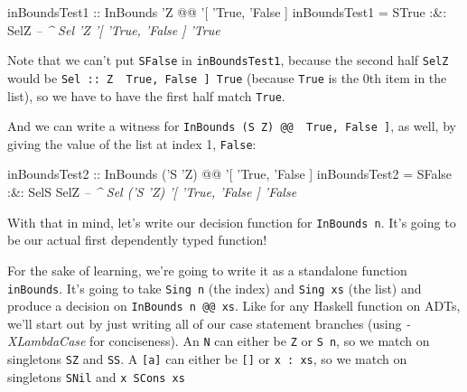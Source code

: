 \documentclass[]{article}
\newenvironment{Shaded}{}{}
\newcommand{\CommentTok}[1]{\textcolor[rgb]{0.38,0.63,0.69}{\textit{#1}}}
\newcommand{\DataTypeTok}[1]{\textcolor[rgb]{0.56,0.13,0.00}{#1}}
\newcommand{\FunctionTok}[1]{\textcolor[rgb]{0.02,0.16,0.49}{#1}}
\newcommand{\NormalTok}[1]{#1}
\newcommand{\OtherTok}[1]{\textcolor[rgb]{0.00,0.44,0.13}{#1}}
\begin{document}
\begin{Shaded}
\begin{Highlighting}[]
\OtherTok{inBoundsTest1 ::} \DataTypeTok{InBounds}\NormalTok{ '}\DataTypeTok{Z} \FunctionTok{@@}\NormalTok{ '[ '}\DataTypeTok{True}\NormalTok{, '}\DataTypeTok{False}\NormalTok{ ]}
\NormalTok{inBoundsTest1 }\FunctionTok{=} \DataTypeTok{STrue} \FunctionTok{:&:} \DataTypeTok{SelZ}
                       \CommentTok{-- ^ Sel 'Z '[ 'True, 'False ] 'True}
\end{Highlighting}
\end{Shaded}

Note that we can't put \texttt{SFalse} in \texttt{inBoundsTest1}, because the
second half \texttt{SelZ} would be
\texttt{Sel\ ::\ \textquotesingle{}Z\ \textquotesingle{}{[}\ \textquotesingle{}True,\ \textquotesingle{}False\ {]}\ \textquotesingle{}True}
(because \texttt{\textquotesingle{}True} is the 0th item in the list), so we
have to have the first half match \texttt{\textquotesingle{}True}.

And we can write a witness for
\texttt{InBounds\ (\textquotesingle{}S\ \textquotesingle{}Z)\ @@\ \textquotesingle{}{[}\ \textquotesingle{}True,\ \textquotesingle{}False\ {]}},
as well, by giving the value of the list at index 1,
\texttt{\textquotesingle{}False}:

\begin{Shaded}
\begin{Highlighting}[]
\OtherTok{inBoundsTest2 ::} \DataTypeTok{InBounds}\NormalTok{ ('}\DataTypeTok{S}\NormalTok{ '}\DataTypeTok{Z}\NormalTok{) }\FunctionTok{@@}\NormalTok{ '[ '}\DataTypeTok{True}\NormalTok{, '}\DataTypeTok{False}\NormalTok{ ]}
\NormalTok{inBoundsTest2 }\FunctionTok{=} \DataTypeTok{SFalse} \FunctionTok{:&:} \DataTypeTok{SelS} \DataTypeTok{SelZ}
                        \CommentTok{-- ^ Sel ('S 'Z) '[ 'True, 'False ] 'False}
\end{Highlighting}
\end{Shaded}

With that in mind, let's write our decision function for \texttt{InBounds\ n}.
It's going to be our actual first dependently typed function!

For the sake of learning, we're going to write it as a standalone function
\texttt{inBounds}. It's going to take \texttt{Sing\ n} (the index) and
\texttt{Sing\ xs} (the list) and produce a decision on
\texttt{InBounds\ n\ @@\ xs}. Like for any Haskell function on ADTs, we'll start
out by just writing all of our case statement branches (using
\emph{-XLambdaCase} for conciseness). An \texttt{N} can either be \texttt{Z} or
\texttt{S\ n}, so we match on singletons \texttt{SZ} and \texttt{SS}. A
\texttt{{[}a{]}} can either be \texttt{{[}{]}} or \texttt{x\ :\ xs}, so we match
on singletons \texttt{SNil} and
\texttt{x\ \textasciigrave{}SCons\textasciigrave{}\ xs}
\end{document}

